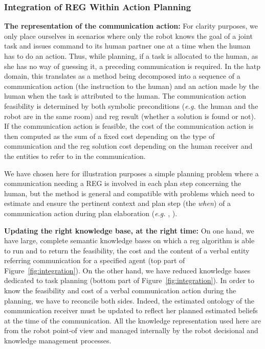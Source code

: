 \documentclass[a4paper,11pt,twoside]{StyleThese}
\begin{document}
\subsubsection{Integration of REG Within Action Planning}
\textbf{The representation of the communication action:}
For clarity purposes, we only place ourselves in scenarios where only the robot knows the goal of a joint task and issues command to its human partner one at a time when the human has to do an action. Thus, while planning, if a task is allocated to the human, as she has no way of guessing it, a preceding communication is required. In the \acrshort{hatp} domain, this translates as a method being decomposed into a sequence of a communication action (the instruction to the human) and an action made by the human when the task is attributed to the human. The communication action feasibility is determined by both symbolic preconditions (\textit{e.g.} the human and the robot are in the same room) and \acrshort{reg} result (whether a solution is found or not). If the communication action is feasible, the cost of the communication action is then computed as the sum of a fixed cost depending on the type of communication and the \acrshort{reg} solution cost depending on the human receiver and the entities to refer to in the communication.

We have chosen here for illustration purposes a simple planning problem where a communication needing a REG is involved in each plan step concerning the human, but the method is general and compatible with problems which need to  estimate and ensure the pertinent context and plan step (the \textit{when}) of a communication action during plan elaboration (\textit{e.g.} \cite{devin2016implemented}, \cite{unhelkar2020decision}).

\textbf{Updating the right knowledge base, at the right time:}
On one hand, we have large, complete semantic knowledge bases on which a \acrshort{reg} algorithm is able to run and to return the feasibility, the cost and the content of a verbal entity referring communication for a specified agent (top part of Figure~\ref{fig:integration}). On the other hand, we have reduced knowledge bases dedicated to task planning (bottom part of Figure~\ref{fig:integration}). In order to know the feasibility and cost of a verbal communication action during the planning, we have to reconcile both sides. Indeed, the estimated ontology of the communication receiver must be updated to reflect her planned estimated beliefs at the time of the communication. All the knowledge representation used here are from the robot point-of view and managed internally by the robot decisional and knowledge management processes.
\end{document}

